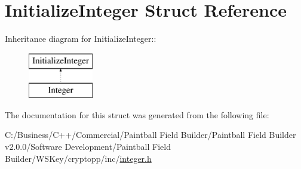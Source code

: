 \hypertarget{struct_initialize_integer}{
\section{InitializeInteger Struct Reference}
\label{struct_initialize_integer}
}
Inheritance diagram for InitializeInteger::\begin{figure}[H]
\begin{center}
\leavevmode
\includegraphics[height=2cm]{struct_initialize_integer}
\end{center}
\end{figure}


The documentation for this struct was generated from the following file:\begin{DoxyCompactItemize}
\item 
C:/Business/C++/Commercial/Paintball Field Builder/Paintball Field Builder v2.0.0/Software Development/Paintball Field Builder/WSKey/cryptopp/inc/\hyperlink{integer_8h}{integer.h}\end{DoxyCompactItemize}
